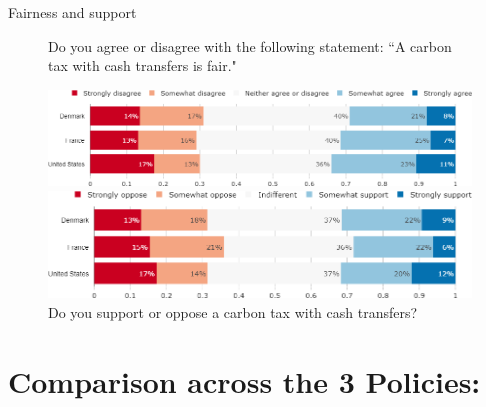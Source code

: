 \documentclass[aspectratio=169,9pt,dvipsnames]{beamer}
\begin{document}
\begin{frame}{Fairness and support}%
\begin{figure}[h!]
\centering
\caption{Do you agree or disagree with the following statement: ``A carbon tax with cash transfers is fair."}
\includegraphics[width=.7\textwidth]{../figures/country_comparison/tax_transfers_fair_countries.png}
\vspace{.5cm}
\centering
\caption{Do you support or oppose a carbon tax with cash transfers?}
\includegraphics[width=.7\textwidth]{../figures/country_comparison/tax_transfers_support_countries.png}
\end{figure}

\end{frame}

\section{Comparison across the 3 Policies:}

\end{document}
